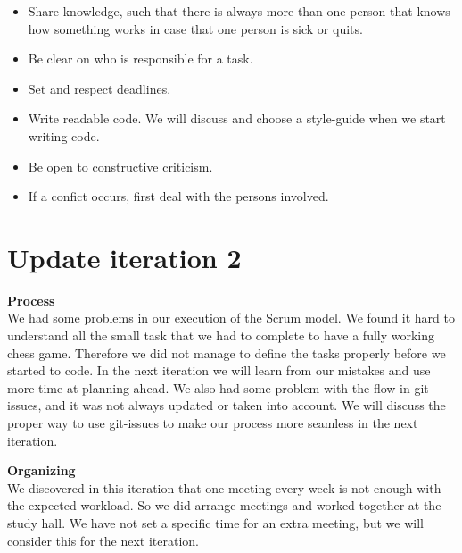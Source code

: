 \documentclass[norsk]{article}
\begin{document}
  \begin{itemize}
  	\item 
  	Share knowledge, such that there is always more than one person that knows how something works in case that one person is sick or quits.
  	\item 
  	Be clear on who is responsible for a task.
  	\item 
  	Set and respect deadlines.
  	\item 
  	Write readable code. We will discuss and choose a style-guide when we start writing code. 
  	\item 
  	Be open to constructive criticism.
  	\item
  	If a confict occurs, first deal with the persons involved. 
 \end{itemize}

\section{Update iteration 2}

\textbf{Process}\\
We had some problems in our execution of the Scrum model. We found it hard to understand all the small task that we had to complete to have a fully working chess game. Therefore we did not manage to define the tasks properly before we started to code. In the next iteration we will learn from our mistakes and use more time at planning ahead. We also had some problem with the flow in git-issues, and it was not always updated or taken into account. We will discuss the proper way to use git-issues to make our process more seamless in the next iteration.

\textbf{Organizing}\\
We discovered in this iteration that one meeting every week is not enough with the expected workload. So we did arrange meetings and worked together at the study hall. We have not set a specific time for an extra meeting, but we will consider this for the next iteration.


	
\end{document}
